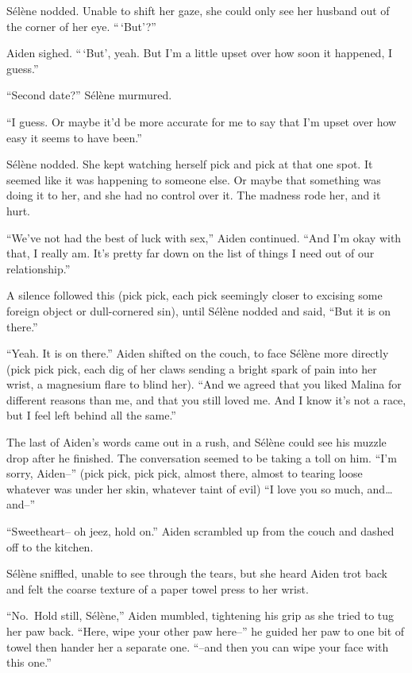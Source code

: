 Sélène nodded. Unable to shift her gaze, she could only see her husband out of the corner of her eye. ``\,`But'?''

Aiden sighed. ``\,`But', yeah. But I'm a little upset over how soon it happened, I guess.''

``Second date?'' Sélène murmured.

``I guess. Or maybe it'd be more accurate for me to say that I'm upset over how easy it seems to have been.''

Sélène nodded. She kept watching herself pick and pick at that one spot. It seemed like it was happening to someone else. Or maybe that something was doing it to her, and she had no control over it. The madness rode her, and it hurt.

``We've not had the best of luck with sex,'' Aiden continued. ``And I'm okay with that, I really am. It's pretty far down on the list of things I need out of our relationship.''

A silence followed this (pick pick, each pick seemingly closer to excising some foreign object or dull-cornered sin), until Sélène nodded and said, ``But it is on there.''

``Yeah. It is on there.'' Aiden shifted on the couch, to face Sélène more directly (pick pick pick, each dig of her claws sending a bright spark of pain into her wrist, a magnesium flare to blind her). ``And we agreed that you liked Malina for different reasons than me, and that you still loved me. And I know it's not a race, but I feel left behind all the same.''

The last of Aiden's words came out in a rush, and Sélène could see his muzzle drop after he finished. The conversation seemed to be taking a toll on him. ``I'm sorry, Aiden--'' (pick pick, pick pick, almost there, almost to tearing loose whatever was under her skin, whatever taint of evil) ``I love you so much, and\ldots{}and--''

``Sweetheart-- oh jeez, hold on.'' Aiden scrambled up from the couch and dashed off to the kitchen.

Sélène sniffled, unable to see through the tears, but she heard Aiden trot back and felt the coarse texture of a paper towel press to her wrist.

``No.~Hold still, Sélène,'' Aiden mumbled, tightening his grip as she tried to tug her paw back. ``Here, wipe your other paw here--'' he guided her paw to one bit of towel then hander her a separate one. ``--and then you can wipe your face with this one.''

